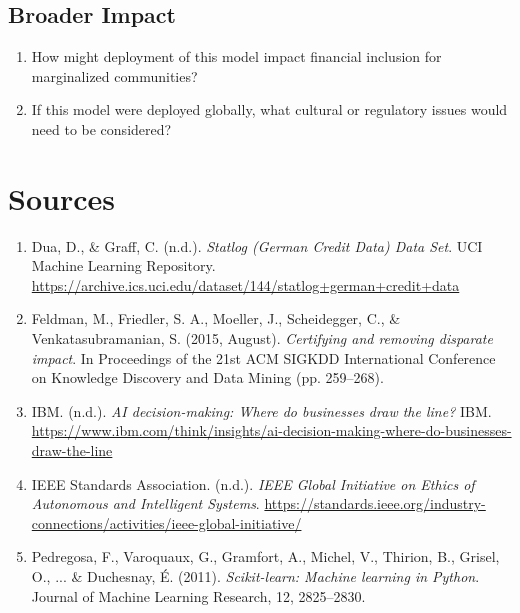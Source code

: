 \documentclass[12pt]{article}
\begin{document}
	\subsection*{Broader Impact}
	\begin{enumerate}
		\item How might deployment of this model impact financial inclusion for marginalized communities?
		\item If this model were deployed globally, what cultural or regulatory issues would need to be considered?
	\end{enumerate}
	
	\pagebreak
	
	\section{Sources}
	\begin{enumerate}
		\item Dua, D., \& Graff, C. (n.d.). \textit{Statlog (German Credit Data) Data Set}. UCI Machine Learning Repository. \url{https://archive.ics.uci.edu/dataset/144/statlog+german+credit+data}
		\item Feldman, M., Friedler, S. A., Moeller, J., Scheidegger, C., \& Venkatasubramanian, S. (2015, August). \textit{Certifying and removing disparate impact}. In Proceedings of the 21st ACM SIGKDD International Conference on Knowledge Discovery and Data Mining (pp. 259--268).
		
		\item IBM. (n.d.). \textit{AI decision-making: Where do businesses draw the line?} IBM. \url{https://www.ibm.com/think/insights/ai-decision-making-where-do-businesses-draw-the-line}
		
		\item IEEE Standards Association. (n.d.). \textit{IEEE Global Initiative on Ethics of Autonomous and Intelligent Systems}. \url{https://standards.ieee.org/industry-connections/activities/ieee-global-initiative/}
		\item Pedregosa, F., Varoquaux, G., Gramfort, A., Michel, V., Thirion, B., Grisel, O., ... \& Duchesnay, É. (2011). \textit{Scikit-learn: Machine learning in Python}. Journal of Machine Learning Research, 12, 2825--2830.
		
		
	\end{enumerate}
	
\end{document}
